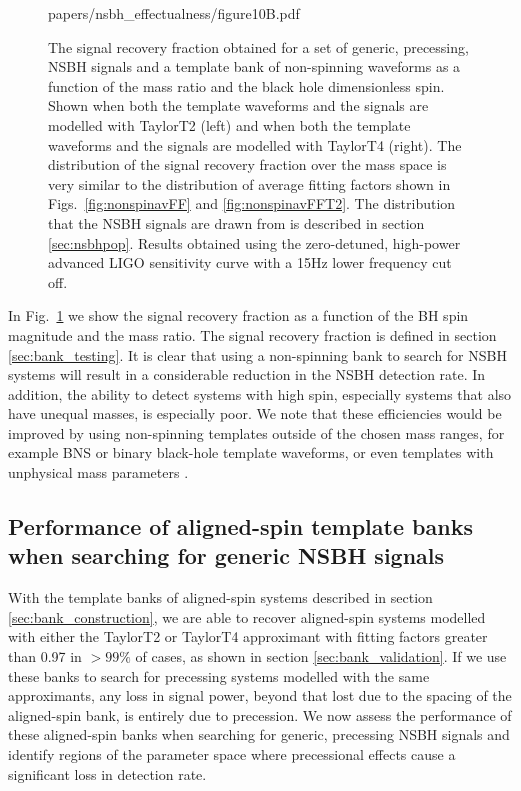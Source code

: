 \begin{figure}
\begin{minipage}[l]{\columnwidth}
{papers/nsbh_effectualness/figure10B.pdf}
\caption{\label{fig:nonspineffFF}
The signal recovery fraction obtained for a set of generic, precessing, NSBH
signals and a template bank of non-spinning waveforms as a function of the mass
ratio and the black hole dimensionless spin. Shown when both the
template waveforms and the signals are modelled with TaylorT2 (left) and when
both the template waveforms and the signals are modelled with TaylorT4 (right).
The distribution of the signal recovery fraction over the mass space is very 
similar to the distribution of average fitting factors shown in 
Figs.~\ref{fig:nonspinavFF} and \ref{fig:nonspinavFFT2}.
The distribution that the NSBH
signals are drawn from is described in section \ref{sec:nsbhpop}.
Results obtained
using the zero-detuned, high-power advanced LIGO sensitivity curve with a 15Hz
lower frequency cut off.
}
\end{minipage}
\end{figure}

In Fig.~\ref{fig:nonspineffFF} we show
the signal recovery fraction as a function of the \ac{BH} spin magnitude and
the mass ratio. The signal recovery fraction is defined in section 
\ref{sec:bank_testing}.
It is clear that using a non-spinning bank to search for \ac{NSBH} systems will
result in a considerable reduction
in the \ac{NSBH} detection rate. In addition, the ability to
detect systems with high spin, especially systems that also have unequal 
masses, is especially poor.  We note that these efficiencies would be
improved by using non-spinning templates outside of the chosen mass ranges, for
example \ac{BNS} or binary black-hole template waveforms, or even templates
with unphysical mass parameters \cite{Brown:2012qf,Baird:2012cu}.

\subsection{Performance of aligned-spin template banks when searching for 
generic NSBH signals}
\label{sec:aligned_spin}

With the template banks of aligned-spin systems described in section
\ref{sec:bank_construction}, we are able to recover aligned-spin systems
modelled with either the TaylorT2 or TaylorT4 approximant with fitting factors
greater than 0.97 in $>99\%$ of cases, as shown in section
\ref{sec:bank_validation}.
If we use these banks to search for precessing systems modelled with the same
approximants, any loss in signal power, beyond that lost due to the spacing of
the aligned-spin bank, is entirely due to precession.
We now assess the performance of these aligned-spin banks when searching for
generic, precessing \ac{NSBH} signals and identify regions of the
parameter space where precessional effects cause a significant loss in
detection rate.

